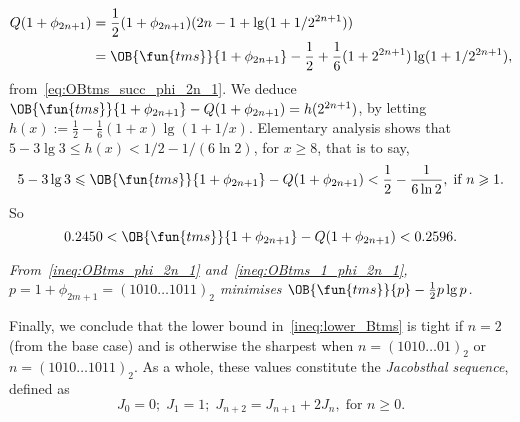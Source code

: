 \begin{itemize}
\begin{align*}
      Q(1+\phi_{2n+1}) &= \frac{1}{2}(1+\phi_{2n+1})(2n-1 + \lg(1+1/2^{2n+1}))\\
                      &= \OB{\fun{tms}}{1+\phi_{2n+1}} - \frac{1}{2}
                         + \frac{1}{6}(1+2^{2n+1})\lg(1+1/2^{2n+1}),
    \end{align*}
    from~\eqref{eq:OBtms_succ_phi_2n_1}. We deduce
    \(\OB{\fun{tms}}{1+\phi_{2n+1}} - Q(1+\phi_{2n+1}) =
    h(2^{2n+1})\), by letting \(h(x) := \tfrac{1}{2} -
    \tfrac{1}{6}(1+x)\lg(1+1/x)\). Elementary analysis shows that \(5
    - 3\lg 3 \leqslant h(x) < 1/2 - 1/(6\ln 2)\), for \(x \geqslant
    8\), that is to say,
    \begin{equation*}
      5 - 3\lg 3 \leqslant \OB{\fun{tms}}{1+\phi_{2n+1}} -
      Q(1+\phi_{2n+1}) < \frac{1}{2} - \frac{1}{6\ln 2},\; \text{if
        \(n \geqslant 1\)}.
    \end{equation*}
    So
    \begin{equation}
      0.2450 < \smash{\OB{\fun{tms}}{1+\phi_{2n+1}}} -
      Q(1+\phi_{2n+1}) < 0.2596.
      \label{ineq:OBtms_1_phi_2n_1}
    \end{equation}

    \bigskip
    \textsl{From~\eqref{ineq:OBtms_phi_2n_1}
      and~\eqref{ineq:OBtms_1_phi_2n_1}, \(p = 1+\phi_{2m+1} =
      (1010\dots1011)_2\) minimises \(\OB{\fun{tms}}{p} -
      \tfrac{1}{2}p\lg p\).}

\end{itemize}
Finally, we conclude that the lower bound in~\eqref{ineq:lower_Btms}
is tight if \(n=2\) (from the base case) and is otherwise the sharpest
when \(n=(1010\dots01)_2\) or \(n=(1010\dots1011)_2\). As a whole,
these values constitute the \emph{Jacobsthal
  sequence}, defined as
\begin{equation}
J_0 = 0; \; J_1=1; \; J_{n+2} = J_{n+1} + 2J_{n},\; \text{for \(n
  \geqslant 0\).}
\label{eq:Jacobsthal}
\end{equation}

